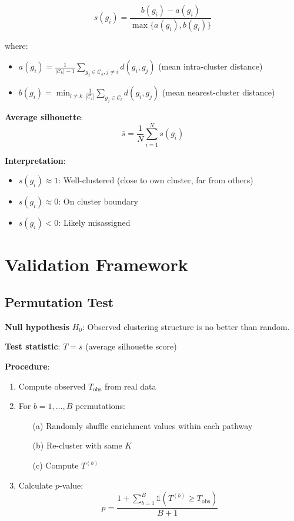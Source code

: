 \documentclass[12pt,letterpaper]{article}
\theoremstyle{definition}
\theoremstyle{remark}
\begin{document}
\begin{equation}
s(g_i) = \frac{b(g_i) - a(g_i)}{\max\{a(g_i), b(g_i)\}}
\end{equation}

where:
\begin{itemize}
    \item $a(g_i) = \frac{1}{|\mathcal{C}_k| - 1} \sum_{g_j \in \mathcal{C}_k, j \neq i} d(g_i, g_j)$ (mean intra-cluster distance)
    \item $b(g_i) = \min_{l \neq k} \frac{1}{|\mathcal{C}_l|} \sum_{g_j \in \mathcal{C}_l} d(g_i, g_j)$ (mean nearest-cluster distance)
\end{itemize}

\textbf{Average silhouette}:
\begin{equation}
\bar{s} = \frac{1}{N} \sum_{i=1}^N s(g_i)
\end{equation}

\textbf{Interpretation}:
\begin{itemize}
    \item $s(g_i) \approx 1$: Well-clustered (close to own cluster, far from others)
    \item $s(g_i) \approx 0$: On cluster boundary
    \item $s(g_i) < 0$: Likely misassigned
\end{itemize}

\section{Validation Framework}

\subsection{Permutation Test}

\textbf{Null hypothesis} $H_0$: Observed clustering structure is no better than random.

\textbf{Test statistic}: $T = \bar{s}$ (average silhouette score)

\textbf{Procedure}:
\begin{enumerate}
    \item Compute observed $T_{\text{obs}}$ from real data
    \item For $b = 1, \ldots, B$ permutations:
    \begin{itemize}
        \item[(a)] Randomly shuffle enrichment values within each pathway
        \item[(b)] Re-cluster with same $K$
        \item[(c)] Compute $T^{(b)}$
    \end{itemize}
    \item Calculate $p$-value:
    \begin{equation}
    p = \frac{1 + \sum_{b=1}^B \mathbb{1}(T^{(b)} \geq T_{\text{obs}})}{B + 1}
    \end{equation}
\end{enumerate}
\end{document}
